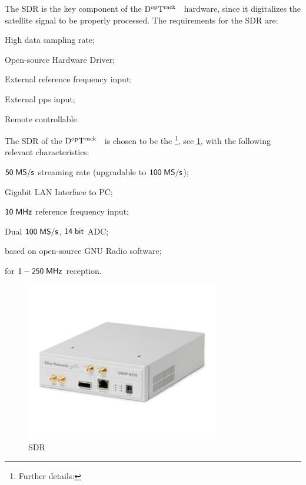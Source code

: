 \documentclass[11pt,a4paper,oneside]{article}
\newcommand{\GroundStationName}{${\rm D^{\rm op}T^{\rm rack}}$}
\newcommand{\semitextwidth}{0.75\textwidth}
\newcommand{\listskip}{0pt}
\newenvironment{itemize*}
{\begin{itemize}
  \setlength{\itemsep}{\listskip}
  \setlength{\parskip}{\listskip}
  \setlength{\parsep}{\listskip}}
{\end{itemize}}
\newcommand{\unit}[2]{$ {\sf #1}\thickspace{\sf #2}$}
\begin{document}
The \ac{SDR} is the key component of the \GroundStationName~ hardware, since it digitalizes the satellite signal to be properly processed. The requirements for the \ac{SDR} are:

\begin{itemize*}
\item High data sampling rate;
\item Open-source Hardware Driver;
\item External reference frequency input;
\item External \ac{pps} input;
\item Remote controllable.
\end{itemize*}

The \ac{SDR} of the \GroundStationName~ is chosen to be the \footnote{Further details: }, see \ref{fig:sdr}, with the following relevant characteristics:

\begin{itemize*}
\item \unit{50}{MS/s} streaming rate (upgradable to \unit{100}{MS/s});
\item Gigabit \ac{LAN} Interface to \ac{PC};
\item \unit{10}{MHz} reference frequency input;
\item Dual \unit{100}{MS/s}, \unit{14}{bit} \ac{ADC};
\item based on open-source GNU Radio software;
\item {} for \unit{1-250}{MHz} reception.
\end{itemize*}

\begin{figure}[!ht]
\centering
\includegraphics[width=\semitextwidth]{sdr}
\caption{\acl{SDR}}
\label{fig:sdr}
\end{figure}
\end{document}
